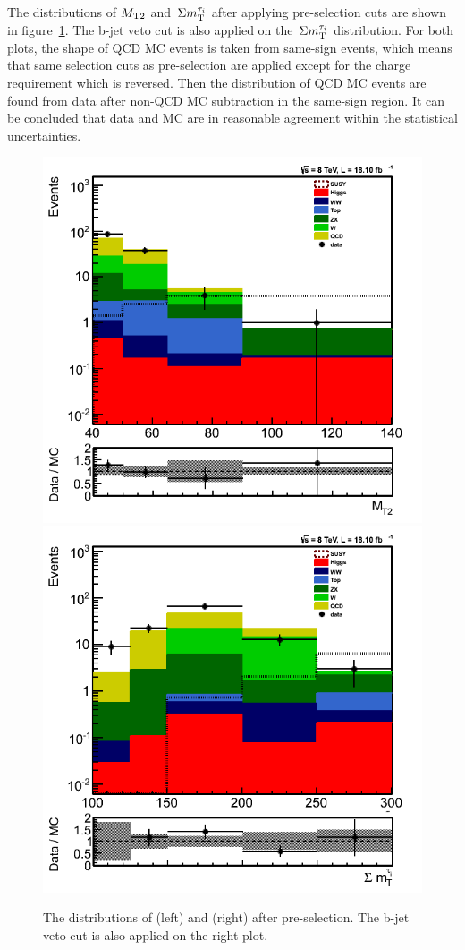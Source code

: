 The distributions of ${M_{\rm T2}}$ and $\,\Sigma m_{\rm T}^{\tau_i}$ after applying pre-selection cuts are shown in figure~\ref{fig:comparison}.
The b-jet veto cut is also applied on the $\,\Sigma m_{\rm T}^{\tau_i}$ distribution. For both plots, the shape of QCD MC events
is taken from same-sign events, which means that same selection cuts as pre-selection are applied except for the charge
requirement which is reversed. Then the distribution of QCD MC events are found from data after non-QCD MC subtraction
in the same-sign region. It can be concluded that data and MC are in reasonable agreement within the statistical uncertainties.
\begin{figure}[!Hhtb]
\centering
\includegraphics[angle=0,scale=0.35]{TauTauFigs/MT2_SSQCD_dataunblinding.png}
\includegraphics[angle=0,scale=0.35]{TauTauFigs/SumMT_SSQCD_dataunblinding.png} \\
\caption{The distributions of \mttwo (left) and \SumMT (right) after pre-selection. The b-jet veto cut is also applied on the right plot.}
\label{fig:comparison}
\end{figure}
